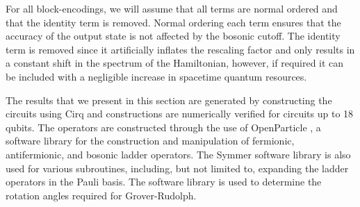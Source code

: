 For all block-encodings, we will assume that all terms are normal ordered and that the identity term is removed.
Normal ordering each term ensures that the accuracy of the output state is not affected by the bosonic cutoff.
The identity term is removed since it artificially inflates the rescaling factor and only results in a constant shift in the spectrum of the Hamiltonian, however, if required it can be included with a negligible increase in spacetime quantum resources.

The results that we present in this section are generated by constructing the circuits using Cirq \cite{cirq} and constructions are numerically verified for circuits up to 18 qubits.
The operators are constructed through the use of OpenParticle \cite{openparticle}, a software library for the construction and manipulation of fermionic, antifermionic, and bosonic ladder operators.
The Symmer software library \cite{} is also used for various subroutines, including, but not limited to, expanding the ladder operators in the Pauli basis.
The software library \cite{grover-rudolph-github} is used to determine the rotation angles required for Grover-Rudolph.






